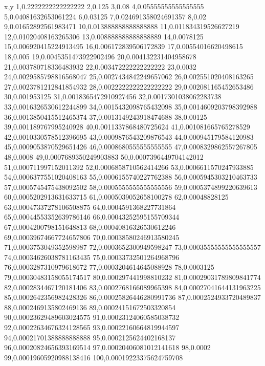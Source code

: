 x,y
1,0.2222222222222222
2,0.125
3,0.08
4,0.05555555555555555
5,0.04081632653061224
6,0.03125
7,0.024691358024691357
8,0.02
9,0.01652892561983471
10,0.013888888888888888
11,0.011834319526627219
12,0.01020408163265306
13,0.008888888888888889
14,0.0078125
15,0.006920415224913495
16,0.006172839506172839
17,0.00554016620498615
18,0.005
19,0.0045351473922902496
20,0.004132231404958678
21,0.003780718336483932
22,0.003472222222222222
23,0.0032
24,0.0029585798816568047
25,0.0027434842249657062
26,0.002551020408163265
27,0.0023781212841854932
28,0.0022222222222222222
29,0.002081165452653486
30,0.001953125
31,0.0018365472910927456
32,0.0017301038062283738
33,0.0016326530612244899
34,0.0015432098765432098
35,0.0014609203798392988
36,0.0013850415512465374
37,0.0013149243918474688
38,0.00125
39,0.001189767995240928
40,0.0011337868480725624
41,0.001081665765278529
42,0.0010330578512396695
43,0.0009876543209876543
44,0.000945179584120983
45,0.0009053870529651426
46,0.0008680555555555555
47,0.0008329862557267805
48,0.0008
49,0.0007689350249903883
50,0.0007396449704142012
51,0.000711997152011392
52,0.0006858710562414266
53,0.0006611570247933885
54,0.0006377551020408163
55,0.0006155740227762388
56,0.0005945303210463733
57,0.0005745475438092502
58,0.0005555555555555556
59,0.0005374899220639613
60,0.0005202913631633715
61,0.0005039052658100278
62,0.00048828125
63,0.00047337278106508875
64,0.0004591368227731864
65,0.00044553352639786146
66,0.00043252595155709344
67,0.0004200798151648813
68,0.00040816326530612246
69,0.00039674667724657806
70,0.00038580246913580245
71,0.0003753049352598987
72,0.0003652300949598247
73,0.00035555555555555557
74,0.00034626038781163435
75,0.00033732501264968796
76,0.0003287310979618672
77,0.0003204614645088928
78,0.0003125
79,0.00030483158055174517
80,0.000297441998810232
81,0.00029031789809841774
82,0.0002834467120181406
83,0.0002768166089965398
84,0.00027041644131963225
85,0.0002642356982428326
86,0.00025826446280991736
87,0.0002524933720489837
88,0.0002469135802469136
89,0.00024151672503320854
90,0.00023629489603024575
91,0.00023124060585038732
92,0.00022634676324128565
93,0.00022160664819944597
94,0.00021701388888888888
95,0.0002125624402168137
96,0.00020824656393169514
97,0.00020406081012141618
98,0.0002
99,0.00019605920988138416
100,0.00019223375624759708
